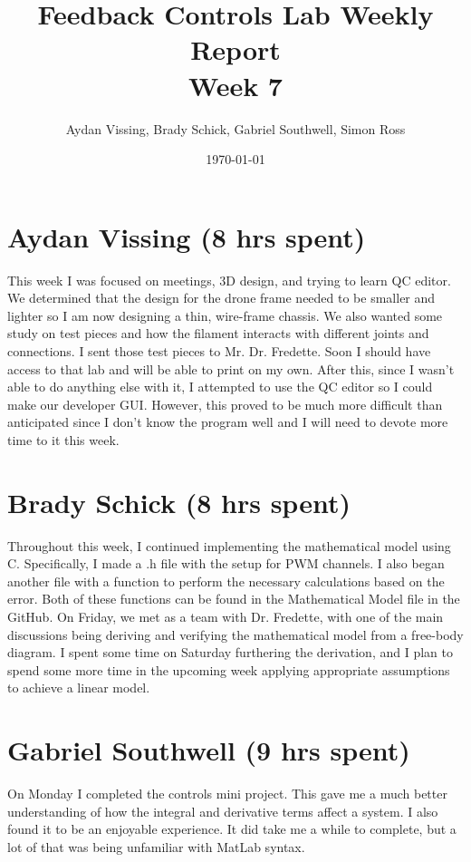 \documentclass[12pt, titlepage]{article}
\title{Feedback Controls Lab Weekly Report \\ \normalsize{Week 7}}
\author{Aydan Vissing, Brady Schick, Gabriel Southwell, Simon Ross}
\date{\today}
\begin{document}
\maketitle

\section*{Aydan Vissing (8 hrs spent)}

This week I was focused on meetings, 3D design, and trying to learn QC editor. We determined that the design for the drone frame needed to be smaller and lighter so I am now designing a thin, wire-frame chassis. We also wanted some study on test pieces and how the filament interacts with different joints and connections. I sent those test pieces to Mr. Dr. Fredette. Soon I should have access to that lab and will be able to print on my own. After this, since I wasn't able to do anything else with it, I attempted to use the QC editor so I could make our developer GUI. However, this proved to be much more difficult than anticipated since I don't know the program well and I will need to devote more time to it this week. 

\section*{Brady Schick (8 hrs spent)}

Throughout this week, I continued implementing the mathematical model using C. Specifically, I made a .h file with the setup for PWM channels. I also began another file with a function to perform the necessary calculations based on the error. Both of these functions can be found in the Mathematical Model file in the GitHub. On Friday, we met as a team with Dr. Fredette, with one of the main discussions being deriving and verifying the mathematical model from a free-body diagram. I spent some time on Saturday furthering the derivation, and I plan to spend some more time in the upcoming week applying appropriate assumptions to achieve a linear model.

\section*{Gabriel Southwell (9 hrs spent)}

On Monday I completed the controls mini project. This gave me a much better understanding of how the integral and derivative terms affect a system. I also found it to be an enjoyable experience. It did take me a while to complete, but a lot of that was being unfamiliar with MatLab syntax.
\end{document}
